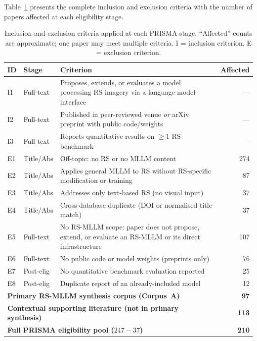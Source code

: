 Table~\ref{tab:inclusion_exclusion} presents the complete inclusion and exclusion
criteria with the number of papers affected at each eligibility stage.

\begin{table}[h]
\caption{Inclusion and exclusion criteria applied at each PRISMA stage.
``Affected'' counts are approximate; one paper may meet multiple criteria.
I = inclusion criterion, E = exclusion criterion.}\label{tab:inclusion_exclusion}
\small\setlength\tabcolsep{4pt}
\begin{tabular*}{\textwidth}{@{\extracolsep\fill}p{0.55cm}p{0.8cm}p{7.8cm}r}
\toprule
\textbf{ID} & \textbf{Stage} & \textbf{Criterion} & \textbf{Affected} \\
\midrule
I1 & Full-text & Proposes, extends, or evaluates a model processing RS imagery via a language-model interface & — \\
I2 & Full-text & Published in peer-reviewed venue \emph{or} arXiv preprint with public code/weights & — \\
I3 & Full-text & Reports quantitative results on $\geq 1$ RS benchmark & — \\
\midrule
E1 & Title/Abs & Off-topic: no RS or no MLLM content & 274 \\
E2 & Title/Abs & Applies general MLLM to RS without RS-specific modification or training & 87  \\
E3 & Title/Abs & Addresses only text-based RS (no visual input) & 37  \\
E4 & Title/Abs & Cross-database duplicate (DOI or normalised title match) & 37  \\
\midrule
E5 & Full-text & No RS-MLLM scope: paper does not propose, extend, or evaluate an RS-MLLM or its direct infrastructure & 107 \\
E6 & Full-text & No public code or model weights (preprints only) & 76  \\
\midrule
E7 & Post-elig & No quantitative benchmark evaluation reported & 25  \\
E8 & Post-elig & Duplicate report of an already-included model & 12   \\
\midrule
\multicolumn{3}{l}{\textbf{Primary RS-MLLM synthesis corpus (Corpus~A)}} & \textbf{97} \\
\multicolumn{3}{l}{\textbf{Contextual supporting literature (not in primary synthesis)}} & \textbf{113} \\
\multicolumn{3}{l}{\textbf{Full PRISMA eligibility pool ($247 - 37$)}} & \textbf{210} \\

\end{tabular*}
\end{table}
